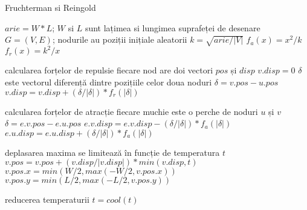 \begin{algorithm}[H]
    \caption{Fruchterman si Reingold}
    \(arie=W*L\); \(W\) si \(L\) sunt lațimea si lungimea suprafeței de desenare\newline
    \(G=(V,E)\); nodurile au poziții inițiale aleatorii\newline
    \(k=\sqrt{arie/|V|}\) \newline
    \(f_a(x)=x^2/k\)\newline
    \(f_r(x)=k^2/x\)\newline 
    \begin{algorithmic}[1]
            \State calcularea forțelor de repulsie
                \State fiecare nod are doi vectori \(pos\) și \(disp\)
                \State \(v.disp=0\)
                        \State \(\delta\) este vectorul diferență dintre pozițiile celor doua noduri
                        \State \(\delta=v.pos-u.pos\)
                        \State \(v.disp=v.disp+(\delta/|\delta|)*f_r(|\delta|)\)
                    \EndIf
                \EndFor
            \EndFor

            \State calcularea forțelor de atracție
                \State fiecare muchie este o perche de noduri \(u\) și \(v\)
                \State \(\delta=e.v.pos-e.u.pos\)
                \State \(e.v.disp=e.v.disp-(\delta/|\delta|)*f_a(|\delta|)\)
                \State \(e.u.disp=e.u.disp+(\delta/|\delta|)*f_a(|\delta|)\)
            \EndFor

            \State deplasarea maxima se limitează în funcție de temperatura \(t\)
                \State \(v.pos=v.pos+(v.disp/|v.disp|)*min(v.disp,t)\)
                \State \(v.pos.x=min(W/2,max(-W/2,v.pos.x))\)
                \State \(v.pos.y=min(L/2,max(-L/2,v.pos.y))\)
            \EndFor

            \State reducerea temperaturii 
            \State \(t=cool(t)\)
        \EndFor
    \end{algorithmic}
\end{algorithm}

  

